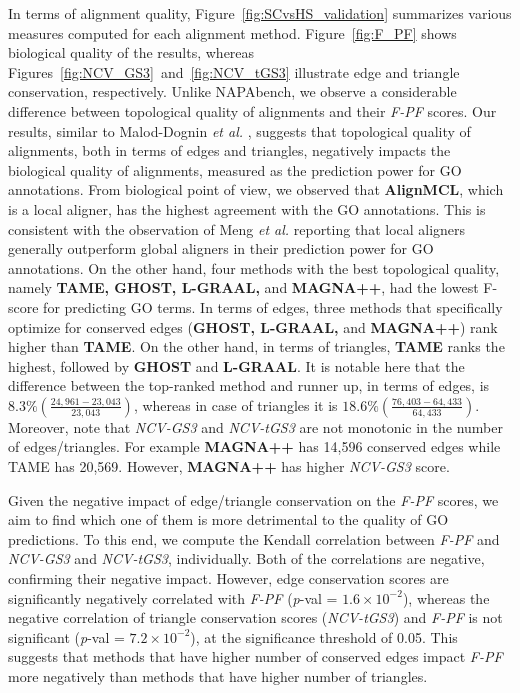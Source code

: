 \documentclass[10pt, journal, compsoc, final]{IEEEtran}
\begin{document}
In terms of alignment quality, Figure~\ref{fig:SCvsHS_validation} summarizes various measures computed for each alignment 
method. Figure~\ref{fig:F_PF} shows biological quality of the results, whereas Figures~\ref{fig:NCV_GS3}~and~\ref{fig:NCV_tGS3} illustrate edge and triangle conservation, respectively. Unlike NAPAbench, we observe a considerable difference between topological quality of alignments and their \textit{F-PF} scores. Our results, similar to Malod-Dognin \textit{et al.} \cite{L-GRAAL}, suggests that topological quality of alignments, both in terms of edges and triangles, negatively impacts the biological quality of alignments, measured as the prediction power for GO annotations. From biological point of view, we observed that \textbf{AlignMCL}, which is a local aligner, has the highest agreement with the GO annotations. This is consistent with the observation of Meng \textit{et al.} \cite{Meng2015} reporting that local aligners generally outperform global aligners in their prediction power for GO annotations. On the other hand, four methods with the best topological quality, namely \textbf{TAME, GHOST, L-GRAAL,} and \textbf{MAGNA++}, had the lowest F-score for predicting GO terms. 
In terms of edges, three methods that specifically optimize for conserved edges (\textbf{GHOST, L-GRAAL,} and \textbf{MAGNA++}) rank higher than \textbf{TAME}. On the other hand, in terms of triangles, \textbf{TAME} ranks the highest, followed by \textbf{GHOST} and \textbf{L-GRAAL}. It is notable here that the difference between the top-ranked method and runner up, in terms of edges, is $8.3\% (\frac{24,961 - 23,043}{23,043})$, whereas in case of triangles it is $18.6\% (\frac{76,403 - 64,433}{64,433})$. Moreover, note that \textit{NCV-GS3} and \textit{NCV-tGS3} are not monotonic in the number of edges/triangles. For example \textbf{MAGNA++} has 14,596 conserved edges while TAME has 20,569. However, \textbf{MAGNA++} has higher \textit{NCV-GS3} score.


Given the negative impact of edge/triangle conservation on the \textit{F-PF} scores, we aim to find which one of them is more detrimental to the quality of GO predictions. To this end, we compute the Kendall correlation between \textit{F-PF} and \textit{NCV-GS3} and \textit{NCV-tGS3}, individually. Both of the correlations are negative, confirming their negative impact. However, edge conservation scores  are significantly negatively correlated with \textit{F-PF} (\emph{p}-val = $1.6 \times 10^{-2}$), whereas the negative correlation of triangle conservation scores (\textit{NCV-tGS3}) and \textit{F-PF} is not significant (\emph{p}-val = $7.2 \times 10^{-2}$), at the significance threshold of 0.05. This suggests that methods that have higher number of conserved edges impact \textit{F-PF} more negatively than methods that have higher number of triangles. 
\end{document}
